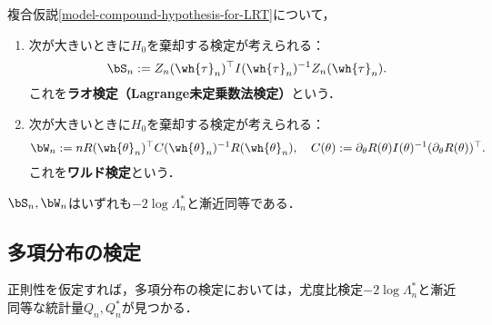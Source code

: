 \documentclass[uplatex,dvipdfmx]{jsreport}
\begin{document}
\begin{definition}
    複合仮説\ref{model-compound-hypothesis-for-LRT}について，
    \begin{enumerate}
        \item 次が大きいときに$H_0$を棄却する検定が考えられる：
        \[\bS_n:=Z_n(\wh{\tau}_n)^\top I(\wh{\tau}_n)^{-1}Z_n(\wh{\tau}_n).\]
        これを\textbf{ラオ検定（Lagrange未定乗数法検定）}という．
        \item 次が大きいときに$H_0$を棄却する検定が考えられる：
        \[\bW_n:=nR(\wh{\theta}_n)^\top C(\wh{\theta}_n)^{-1}R(\wh{\theta}_n),\quad C(\theta):=\partial_\theta R(\theta)I(\theta)^{-1}(\partial_\theta R(\theta))^\top.\]
        これを\textbf{ワルド検定}という．
    \end{enumerate}
\end{definition}

\begin{theorem}
    $\bS_n,\bW_n$はいずれも$-2\log\Lambda_n^*$と漸近同等である．
\end{theorem}

\subsection{多項分布の検定}

\begin{tcolorbox}[colframe=ForestGreen, colback=ForestGreen!10!white,breakable,colbacktitle=ForestGreen!40!white,coltitle=black,fonttitle=\bfseries\sffamily,
title=]
    正則性を仮定すれば，多項分布の検定においては，尤度比検定$-2\log\Lambda^*_n$と漸近同等な統計量$Q_n,Q^*_n$が見つかる．
\end{tcolorbox}
\end{document}
